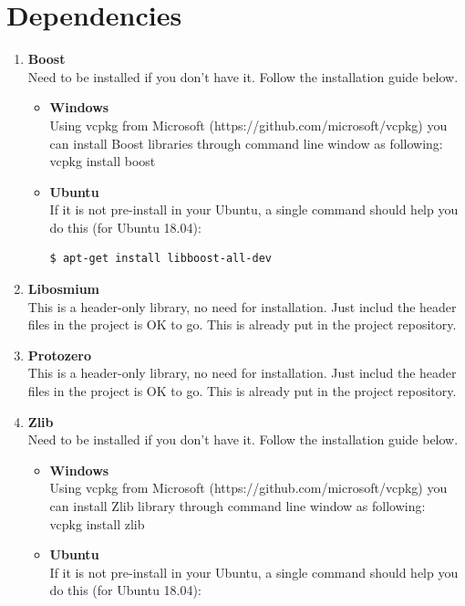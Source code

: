 \documentclass[a4paper, 12pt, english]{book}
\begin{document}
\section{Dependencies}

\begin{enumerate}
	\item {\textbf{Boost}}\\
	Need to be installed if you don't have it. Follow the installation guide below.
		\begin{itemize}[noitemsep]
		\item {\textbf{Windows}} \\
		Using vcpkg from Microsoft (https://github.com/microsoft/vcpkg)
		you can install Boost libraries through command line window as following:\\
		vcpkg install boost
		\item {\textbf{Ubuntu}} \\
		If it is not pre-install in your Ubuntu, a single command 
		should help you do this (for Ubuntu 18.04):
		\begin{lstlisting}[language=bash]
$ apt-get install libboost-all-dev
		\end{lstlisting}
		\end{itemize}
	\item {\textbf{Libosmium}} \\
		This is a header-only library, no need for installation. 
		Just includ the header files in the project is OK to go.
		This is already put in the project repository.
	\item {\textbf{Protozero}} \\
		This is a header-only library, no need for installation. 
		Just includ the header files in the project is OK to go.
		This is already put in the project repository.
	\item {\textbf{Zlib}} \\
	Need to be installed if you don't have it. Follow the installation guide below.
		\begin{itemize}[noitemsep]
		\item {\textbf{Windows}} \\
    	Using vcpkg from Microsoft (https://github.com/microsoft/vcpkg)
		you can install Zlib library through command line window as following:\\
		vcpkg install zlib
		\item {\textbf{Ubuntu}} \\
		If it is not pre-install in your Ubuntu, a single command 
		should help you do this (for Ubuntu 18.04):

\end{itemize}
\end{enumerate}
\end{document}
